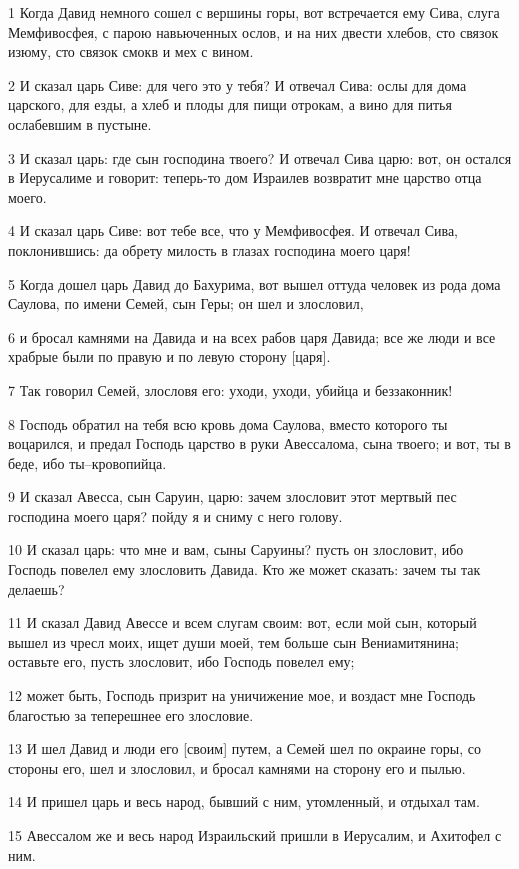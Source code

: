 \par 1 Когда Давид немного сошел с вершины горы, вот встречается ему Сива, слуга Мемфивосфея, с парою навьюченных ослов, и на них двести хлебов, сто связок изюму, сто связок смокв и мех с вином.
\par 2 И сказал царь Сиве: для чего это у тебя? И отвечал Сива: ослы для дома царского, для езды, а хлеб и плоды для пищи отрокам, а вино для питья ослабевшим в пустыне.
\par 3 И сказал царь: где сын господина твоего? И отвечал Сива царю: вот, он остался в Иерусалиме и говорит: теперь-то дом Израилев возвратит мне царство отца моего.
\par 4 И сказал царь Сиве: вот тебе все, что у Мемфивосфея. И отвечал Сива, поклонившись: да обрету милость в глазах господина моего царя!
\par 5 Когда дошел царь Давид до Бахурима, вот вышел оттуда человек из рода дома Саулова, по имени Семей, сын Геры; он шел и злословил,
\par 6 и бросал камнями на Давида и на всех рабов царя Давида; все же люди и все храбрые были по правую и по левую сторону [царя].
\par 7 Так говорил Семей, злословя его: уходи, уходи, убийца и беззаконник!
\par 8 Господь обратил на тебя всю кровь дома Саулова, вместо которого ты воцарился, и предал Господь царство в руки Авессалома, сына твоего; и вот, ты в беде, ибо ты--кровопийца.
\par 9 И сказал Авесса, сын Саруин, царю: зачем злословит этот мертвый пес господина моего царя? пойду я и сниму с него голову.
\par 10 И сказал царь: что мне и вам, сыны Саруины? пусть он злословит, ибо Господь повелел ему злословить Давида. Кто же может сказать: зачем ты так делаешь?
\par 11 И сказал Давид Авессе и всем слугам своим: вот, если мой сын, который вышел из чресл моих, ищет души моей, тем больше сын Вениамитянина; оставьте его, пусть злословит, ибо Господь повелел ему;
\par 12 может быть, Господь призрит на уничижение мое, и воздаст мне Господь благостью за теперешнее его злословие.
\par 13 И шел Давид и люди его [своим] путем, а Семей шел по окраине горы, со стороны его, шел и злословил, и бросал камнями на сторону его и пылью.
\par 14 И пришел царь и весь народ, бывший с ним, утомленный, и отдыхал там.
\par 15 Авессалом же и весь народ Израильский пришли в Иерусалим, и Ахитофел с ним.
